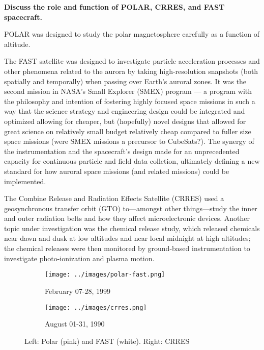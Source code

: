 \textbf{Discuss the role and function of POLAR, CRRES, and FAST spacecraft.}

POLAR was designed to study the polar magnetosphere carefully as a
function of altitude. 

The FAST satellite \citep{McComas1998} was designed to investigate
particle acceleration processes and other phenomena related to the aurora by
taking high-resolution snapshots (both spatially and temporally) when
passing over Earth's auroral zones. It was the second mission in 
NASA's Small Explorer (SMEX) program --- a program with the philosophy
and intention of fostering
highly focused space missions in such a way that the science strategy
and engineering design could be integrated and optimized allowing for
cheaper, but (hopefully) novel designs that allowed for great science on
relatively small budget relatively cheap compared to
fuller size space missions (were SMEX missions a precursor to
CubeSats?). The synergy of the instrumentation and the spacecraft's design made for
an unprecedented capacity for continuous particle and field data
colletion, ultimately defining a new standard for how auroral space
missions (and related missions) could be implemented. 

The Combine Release and Radiation Effects Satellite (CRRES) used a
geosynchronous transfer orbit (GTO) to---amongst other things---study the inner and outer
radiation belts and how they affect microelectronic devices. Another
topic under investigation was the chemical release study, which released
chemicals near dawn and dusk at low altitudes and near local midnight at
high altitudes; the chemical releases were then monitored by
ground-based instrumentation to investigate photo-ionization and plasma
motion.

\begin{figure}[h]
  \centering
  \begin{subfigure}[1a]{0.4\textwidth}
    \centering
    \texttt{[image: ../images/polar-fast.png]}
    \caption{February 07-28, 1999}
  \end{subfigure}
  \hfill
  \begin{subfigure}[1b]{0.4\textwidth}
    \centering
    \texttt{[image: ../images/crres.png]}
    \caption{August 01-31, 1990}
  \end{subfigure}
  \caption{Left: Polar (pink) and FAST (white). Right: CRRES}
  \label{fig-part9}
\end{figure}
